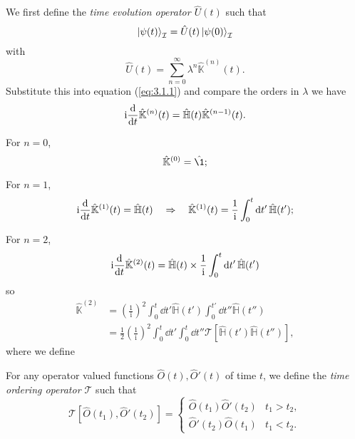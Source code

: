 \documentclass[a4paper,11pt]{article}
\begin{document}
	We first define the \emph{time evolution operator $\hat U(t)$} such that
	\[
		\ket{\psi(t)}_{\mathcal{I}} = \hat U(t) \ket{\psi(0)}_{\mathcal{I}}
	\]
	with
	\[
		\hat U(t) = \sum _{n=0}^{\infty} \lambda^n \hat{\mathbb{K}}^{(n)}(t).
	\]
	Substitute this into equation (\ref{eq:3.1.1}) and compare the orders in $\lambda$ we have
	\[
		\mathrm{i} \dv{t} \hat{\mathbb{K}}^{(n)} (t) = \hat{\mathbb{H}}(t) \hat{\mathbb{K}}^{(n-1)}(t).
	\]
	

	For $n=0$, \[
		\hat{\mathbb{K}}^{(0)} = \hat{\1};
	\]
	
	For $n=1$, \[
		\mathrm{i} \dv{t}\hat{\mathbb{K}}^{(1)}(t) = \hat{\mathbb{H}}(t) \quad \Rightarrow \quad \hat{\mathbb{K}}^{(1)}(t) = \frac{1}{\mathrm{i}} \int_{0}^{t} \dd{t'} \hat{\mathbb{H}}(t');
	\]
	
	For $n = 2$, \[
		\mathrm{i} \dv{t} \hat{\mathbb{K}}^{(2)}(t) = \hat{\mathbb{H}}(t) \times \frac{1}{\mathrm{i}} \int_{0}^{t}\dd{t'} \hat{\mathbb{H}}(t') 
	\]
	so \begin{align*}
		\hat{\mathbb{K}}^{(2)} & = \left( \frac{1}{\mathrm{i}} \right)^2 \int_{0}^{t} \dd{t'} \hat{\mathbb{H}}(t') \int_{0}^{t'} \dd{t''} \hat{\mathbb{H}}(t'')\\
		& = \frac{1}{2} \left( \frac{1}{\mathrm{i}} \right)^2 \int_{0}^{t} \dd{t'} \int_{0}^{t} \dd{t''} \mathcal{T} [\hat{\mathbb{H}}(t') \hat{\mathbb{H}}(t'')],
	\end{align*}
	where we define
	\begin{defi}
		For any operator valued functions $\hat O(t), \hat O'(t)$ of time $t$, we define the \emph{time ordering operator $\mathcal{T}$} such that
		\[
			\mathcal{T}[\hat O(t_1), \hat O'(t_2)] = \begin{cases}
				\hat O(t_1)\hat O'(t_2) & t_1 > t_2,\\
				\hat O'(t_2)\hat O(t_1) & t_1 < t_2.
			\end{cases}
		\]  
	\end{defi}
\end{document}
